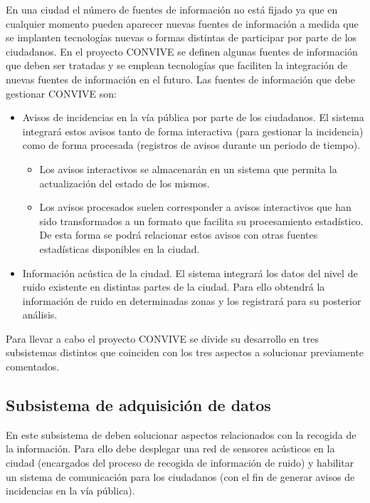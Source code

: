 \documentclass[
  a4paper,
]{scrreport}
\providecommand{\tightlist}{%
  \setlength{\itemsep}{0pt}\setlength{\parskip}{0pt}}\usepackage{longtable,booktabs,array}
\begin{document}
En una ciudad el número de fuentes de información no está fijado ya que
en cualquier momento pueden aparecer nuevas fuentes de información a
medida que se implanten tecnologías nuevas o formas distintas de
participar por parte de los ciudadanos. En el proyecto CONVIVE se
definen algunas fuentes de información que deben ser tratadas y se
emplean tecnologías que faciliten la integración de nuevas fuentes de
información en el futuro. Las fuentes de información que debe gestionar
CONVIVE son:

\begin{itemize}
\tightlist
\item
  Avisos de incidencias en la vía pública por parte de los ciudadanos.
  El sistema integrará estos avisos tanto de forma interactiva (para
  gestionar la incidencia) como de forma procesada (registros de avisos
  durante un periodo de tiempo).

  \begin{itemize}
  \tightlist
  \item
    Los avisos interactivos se almacenarán en un sistema que permita la
    actualización del estado de los mismos.
  \item
    Los avisos procesados suelen corresponder a avisos interactivos que
    han sido transformados a un formato que facilita su procesamiento
    estadístico. De esta forma se podrá relacionar estos avisos con
    otras fuentes estadísticas disponibles en la ciudad.
  \end{itemize}
\item
  Información acústica de la ciudad. El sistema integrará los datos del
  nivel de ruido existente en distintas partes de la ciudad. Para ello
  obtendrá la información de ruido en determinadas zonas y los
  registrará para su posterior análisis.
\end{itemize}

Para llevar a cabo el proyecto CONVIVE se divide su desarrollo en tres
subsistemas distintos que coinciden con los tres aspectos a solucionar
previamente comentados.

\hypertarget{subsistema-de-adquisiciuxf3n-de-datos}{%
\subsection{Subsistema de adquisición de
datos}\label{subsistema-de-adquisiciuxf3n-de-datos}}

En este subsistema de deben solucionar aspectos relacionados con la
recogida de la información. Para ello debe desplegar una red de sensores
acústicos en la ciudad (encargados del proceso de recogida de
información de ruido) y habilitar un sistema de comunicación para los
ciudadanos (con el fin de generar avisos de incidencias en la vía
pública).
\end{document}
